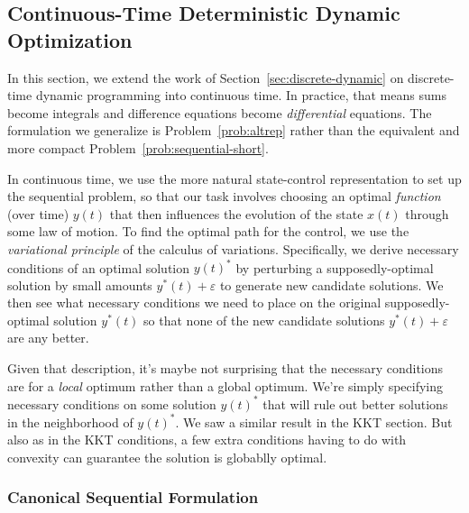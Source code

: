 \documentclass[12pt]{book}
\numberwithin{equation}{section} %
\theoremstyle{plain}
\theoremstyle{definition}
\theoremstyle{remark}
\begin{document}
\clearpage
\subsection{Continuous-Time Deterministic Dynamic Optimization}
\label{sec:continuous-dynamic}

In this section, we extend the work of
Section~\ref{sec:discrete-dynamic} on discrete-time dynamic programming
into continuous time. In practice, that means sums become integrals and
difference equations become \emph{differential} equations.  The
formulation we generalize is Problem~\ref{prob:altrep} rather than the
equivalent and more compact Problem~\ref{prob:sequential-short}.

In continuous time, we use the more natural state-control representation
to set up the sequential problem, so that our task involves choosing an
optimal \emph{function} (over time) $y(t)$ that then influences the
evolution of the state $x(t)$ through some law of motion.
To find the optimal path for the control, we use the
\emph{variational principle} of the calculus of variations.
Specifically, we derive necessary conditions of an optimal solution
$y(t)^*$ by perturbing a supposedly-optimal solution by small amounts
$y^*(t)+\varepsilon$ to generate new candidate solutions.
We then see what necessary conditions we need to place on the original
supposedly-optimal solution $y^*(t)$ so that none of the new candidate
solutions $y^*(t)+\varepsilon$ are any better.

Given that description, it's maybe not surprising that the necessary
conditions are for a \emph{local} optimum rather than a global optimum.
We're simply specifying necessary conditions on some solution $y(t)^*$
that will rule out better solutions in the neighborhood of $y(t)^*$. We
saw a similar result in the KKT section. But also as in the KKT
conditions, a few extra conditions having to do with convexity can
guarantee the solution is globablly optimal.

\subsubsection{Canonical Sequential Formulation}
\end{document}
